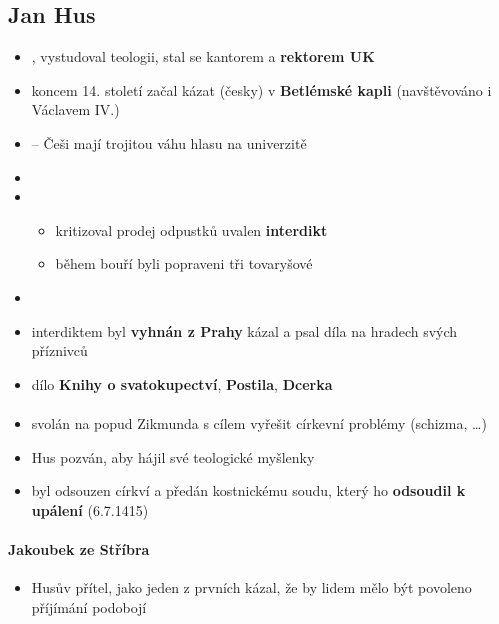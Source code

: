 \subsection{Jan Hus}
\begin{itemize}
\item {}, vystudoval teologii, stal se kantorem a \textbf{rektorem UK}
\item koncem 14. století začal kázat (česky) v \textbf{Betlémské kapli} (navštěvováno i Václavem IV.)
\item {} -- Češi mají trojitou váhu hlasu na univerzitě
\item {}
\item {}
	\begin{itemize}
	\item kritizoval prodej odpustků \ra uvalen \textbf{interdikt}
	\item během bouří byli popraveni tři tovaryšové
	\end{itemize}
\item {}
\item interdiktem byl \textbf{vyhnán z Prahy} \ra kázal a psal díla na hradech svých příznivců
\item dílo \textbf{Knihy o svatokupectví}, \textbf{Postila}, \textbf{Dcerka}
\end{itemize}

\paragraph{}
\begin{itemize}
\item svolán na popud Zikmunda s cílem vyřešit církevní problémy (schizma, \ldots)
\item Hus pozván, aby hájil své teologické myšlenky
\item byl odsouzen církví a předán kostnickému soudu, který ho \textbf{odsoudil k upálení} (6.7.1415)
\end{itemize}

\paragraph{Jakoubek ze Stříbra}
\begin{itemize}
\item Husův přítel, jako jeden z prvních kázal, že by lidem mělo být povoleno příjímání podobojí
\end{itemize}



